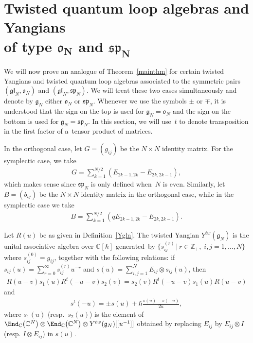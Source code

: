 \section[Twisted quantum loop algebras and Yangians of type $\mathfrak{o}_N$ and $\mathfrak{sp}_N$]{Twisted quantum loop algebras and Yangians\\ of type $\boldsymbol{\mathfrak{o}_N}$ and $\boldsymbol{\mathfrak{sp}_N}$}
\label{twsec}
We will now prove an analogue of Theorem~\ref{mainthm} for certain twisted Yangians and twisted quantum loop algebras
associated to the symmetric pairs $(\mathfrak{gl}_N,\mathfrak{o}_N)$ and
$(\mathfrak{gl}_N,\mathfrak{sp}_N)$.
We will treat these two cases simultaneously and denote by $\mathfrak{g}_N$ either $\mathfrak{o}_N$ or
$\mathfrak{sp}_N$.
Whenever we use the symbols $\pm$ or $\mp$, it is understood that the sign on the top is used for
$\mathfrak{g}_N=\mathfrak{o}_N$ and the sign on the bottom is used for $\mathfrak{g}_N=\mathfrak{sp}_N$.
In this section, we will use~$t$ to denote transposition in the f\/irst factor of a~tensor product of matrices.

In the orthogonal case, let $G=(g_{ij})$ be the $N \times N$ identity matrix.
For the symplectic case, we take
\begin{gather*}
G=\sum\limits_{k=1}^{N/2} (E_{2k-1,2k}-E_{2k,2k-1}),
\end{gather*}
which makes sense since $\mathfrak{sp}_N$ is only def\/ined when~$N$ is even.
Similarly, let $B=(b_{ij})$ be the $N \times N$ identity matrix in the orthogonal case, while in the symplectic case we
take
\begin{gather*}
B=\sum\limits_{k=1}^{N/2} (qE_{2k-1,2k}-E_{2k,2k-1}).
\end{gather*}

\begin{definition}
\label{Ytw}
Let $R(u)$ be as given in Def\/inition~\ref{Ygln}.
The twisted Yangian $Y^{tw}(\mathfrak{g}_N)$ is the unital associative algebra over $\mathbb{C}[\hbar]$ generated~by
$\big\{s_{ij}^{(r)} \,|\, r\in\mathbb{Z}_+,\; i,j=1,\ldots,N\big\}$ where $s_{ij}^{(0)}=g_{ij}$, together with the following
relations: if $s_{ij}(u)=\sum\limits_{r=0}^\infty s_{ij}^{(r)}u^{-r}$ and $s(u)=\sum\limits_{i,j=1}^N E_{ij} \otimes
s_{ij}(u)$, then
\begin{gather*}
R(u-v)s_1(u)R^t(-u-v)s_2(v)=s_2(v)R^t(-u-v)s_1(u)R(u-v)
\end{gather*}
and
\begin{gather*}
s^t(-u)= \pm s(u) + \hbar\frac{s(u)-s(-u)}{2u},
\end{gather*}
where $s_1(u)$ (resp.\
$s_2(u)$) is the element of $\End_{\mathbb{C}}\big(\mathbb{C}^N\big) \otimes \End_{\mathbb{C}}\big(\mathbb{C}^N\big) \otimes
Y^{tw}(\mathfrak{g}_N)[[u^{-1}]]$ obtained by replacing $E_{ij}$ by $E_{ij} \otimes I$ (resp.
$I \otimes E_{ij}$) in $s(u)$.
\end{definition}

